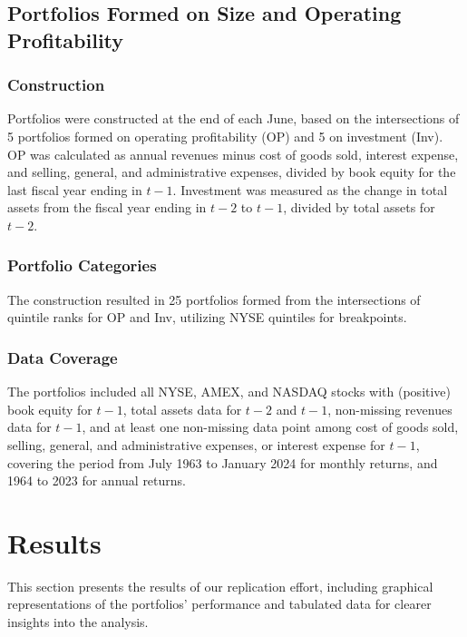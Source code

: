 \documentclass{article}
\begin{document}
\subsection*{Portfolios Formed on Size and Operating Profitability}

\subsubsection*{Construction}

Portfolios were constructed at the end of each June, based on the intersections of 5 portfolios formed on operating profitability (OP) and 5 on investment (Inv). OP was calculated as annual revenues minus cost of goods sold, interest expense, and selling, general, and administrative expenses, divided by book equity for the last fiscal year ending in $t-1$. Investment was measured as the change in total assets from the fiscal year ending in $t-2$ to $t-1$, divided by total assets for $t-2$.

\subsubsection*{Portfolio Categories}

The construction resulted in 25 portfolios formed from the intersections of quintile ranks for OP and Inv, utilizing NYSE quintiles for breakpoints.

\subsubsection*{Data Coverage}

The portfolios included all NYSE, AMEX, and NASDAQ stocks with (positive) book equity for $t-1$, total assets data for $t-2$ and $t-1$, non-missing revenues data for $t-1$, and at least one non-missing data point among cost of goods sold, selling, general, and administrative expenses, or interest expense for $t-1$, covering the period from July 1963 to January 2024 for monthly returns, and 1964 to 2023 for annual returns.

\section*{Results}

This section presents the results of our replication effort, including graphical representations of the portfolios' performance and tabulated data for clearer insights into the analysis.
\end{document}
